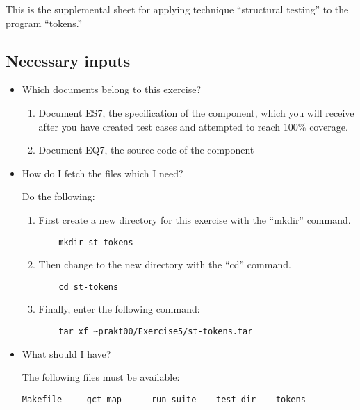 
This is the supplemental sheet 
for applying technique ``structural testing''
to the program ``tokens.'' 



\subsection*{Necessary inputs}

\begin{itemize}

\item Which documents belong to this exercise?

\begin{enumerate}
\item Document ES7, the specification of the component, which you will
receive after you have created test cases and attempted to reach 100\%
coverage.
\item Document EQ7, the source code of the component
\end{enumerate}

\item How do I fetch the files which I need?

Do the following:

\begin{enumerate}

\item First create a new directory for this exercise with the
``mkdir'' command.
\begin{verbatim}
    mkdir st-tokens
\end{verbatim}

\item Then change to the new directory with the ``cd'' command.
\begin{verbatim}
    cd st-tokens
\end{verbatim}

\item Finally, enter the following command:
\begin{path}
\begin{verbatim}
    tar xf ~prakt00/Exercise5/st-tokens.tar
\end{verbatim}
\end{path}

\end{enumerate}

\item What should I have?

The following files must be available:
\begin{verbatim}
Makefile     gct-map      run-suite    test-dir    tokens
\end{verbatim}

\end{itemize}


